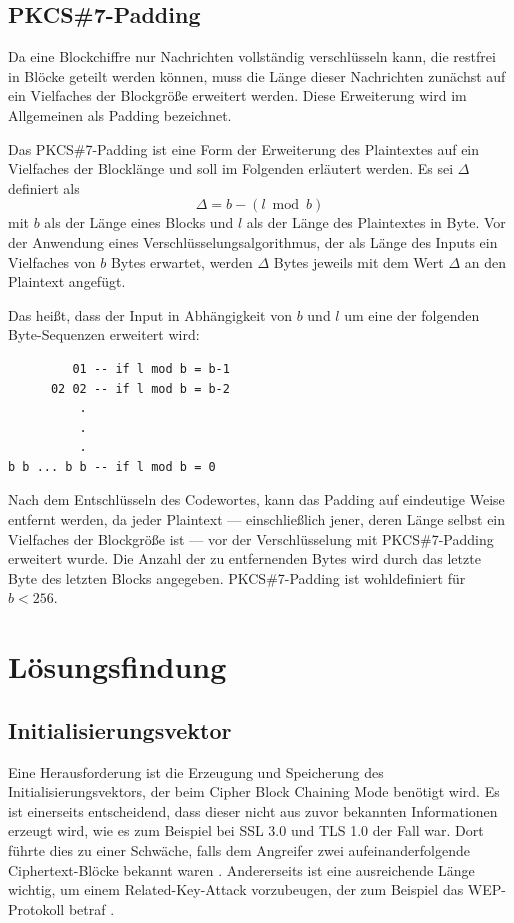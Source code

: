 \documentclass[course=erap]{aspdoc}
\begin{document}
\subsection{PKCS\#7-Padding}

Da eine Blockchiffre nur Nachrichten vollständig verschlüsseln kann, die restfrei in Blöcke geteilt werden können, muss die Länge dieser Nachrichten zunächst auf ein Vielfaches der Blockgröße erweitert werden. Diese Erweiterung wird im Allgemeinen als Padding bezeichnet.\bigbreak

Das PKCS\#7-Padding ist eine Form der Erweiterung des Plaintextes auf ein Vielfaches der Blocklänge und soll im Folgenden erläutert werden. Es sei $\Delta$ definiert als
\[
    \Delta = b - (l \bmod b)
\]
mit $b$ als der Länge eines Blocks und $l$ als der Länge des Plaintextes in Byte. Vor der Anwendung eines Verschlüsselungsalgorithmus, der als Länge des Inputs ein Vielfaches von $b$ Bytes erwartet, werden $\Delta$ Bytes jeweils mit dem Wert $\Delta$ an den Plaintext angefügt.\cite[p.28]{rfc5652}\bigbreak

Das heißt, dass der Input in Abhängigkeit von $b$ und $l$ um eine der folgenden Byte-Sequenzen erweitert wird:

\begin{samepage}
\begin{verbatim}
         01 -- if l mod b = b-1
      02 02 -- if l mod b = b-2
          .
          .
          .
b b ... b b -- if l mod b = 0
\end{verbatim}
\end{samepage}

Nach dem Entschlüsseln des Codewortes, kann das Padding auf eindeutige Weise entfernt werden, da jeder Plaintext --- einschließlich jener, deren Länge selbst ein Vielfaches der Blockgröße ist --- vor der Verschlüsselung mit PKCS\#7-Padding erweitert wurde. Die Anzahl der zu entfernenden Bytes wird durch das letzte Byte des letzten Blocks angegeben. PKCS\#7-Padding ist wohldefiniert für $b < 256$.\cite[p.28]{rfc5652}

\section{Lösungsfindung}

\subsection{Initialisierungsvektor}
\label{sec:Initialisierungsvektor}
Eine Herausforderung ist die Erzeugung und Speicherung des Initialisierungsvektors, der beim Cipher Block Chaining Mode benötigt wird. Es ist einerseits entscheidend, dass dieser nicht aus zuvor bekannten Informationen erzeugt wird, wie es zum Beispiel bei SSL 3.0 und TLS 1.0 der Fall war. Dort führte dies zu einer Schwäche, falls dem Angreifer zwei aufeinanderfolgende Ciphertext-Blöcke bekannt waren \cite{ssltls}. Andererseits ist eine ausreichende Länge wichtig, um einem Related-Key-Attack vorzubeugen, der zum Beispiel das WEP-Protokoll betraf \cite{wep}.\bigbreak
\end{document}
